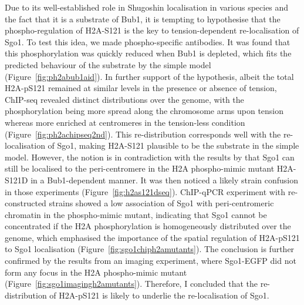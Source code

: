 Due to its well-established role in Shugoshin localisation in various species and the fact that it is a substrate of Bub1, it is tempting to hypothesise that the phospho-regulation of H2A-S121 is the key to tension-dependent re-localisation of Sgo1. To test this idea, we made phospho-specific antibodies. It was found that this phosphorylation was quickly reduced when Bub1 is depleted, which fits the predicted behaviour of the substrate by the simple model (Figure~\ref{fig:ph2abub1aid}). In further support of the hypothesis, albeit the total H2A-pS121 remained at similar levels in the presence or absence of tension, ChIP-seq revealed distinct distributions over the genome, with the phosphorylation being more spread along the chromosome arms upon tension whereas more enriched at centromeres in the tension-less condition (Figure~\ref{fig:ph2achipseq2nd}). This re-distribution corresponds well with the re-localisation of Sgo1, making H2A-S121 plausible to be the substrate in the simple model. However, the notion is in contradiction with the results by \cite{Nerusheva2014} that Sgo1 can still be localised to the peri-centromere in the H2A phospho-mimic mutant H2A-S121D in a Bub1-dependent manner. It was then noticed a likely strain confusion in those experiments (Figure~\ref{fig:h2as121dseq}). ChIP-qPCR experiment with re-constructed strains showed a low association of Sgo1 with peri-centromeric chromatin in the phospho-mimic mutant, indicating that Sgo1 cannot be concentrated if the H2A phosphorylation is homogeneously distributed over the genome, which emphasised the importance of the spatial regulation of H2A-pS121 to Sgo1 localisation (Figure~\ref{fig:sgo1chiph2amutants}). The conclusion is further confirmed by the results from an imaging experiment, where Sgo1-EGFP did not form any focus in the H2A phospho-mimic mutant (Figure~\ref{fig:sgo1imagingh2amutants}). Therefore, I concluded that the re-distribution of H2A-pS121 is likely to underlie the re-localisation of Sgo1. 

